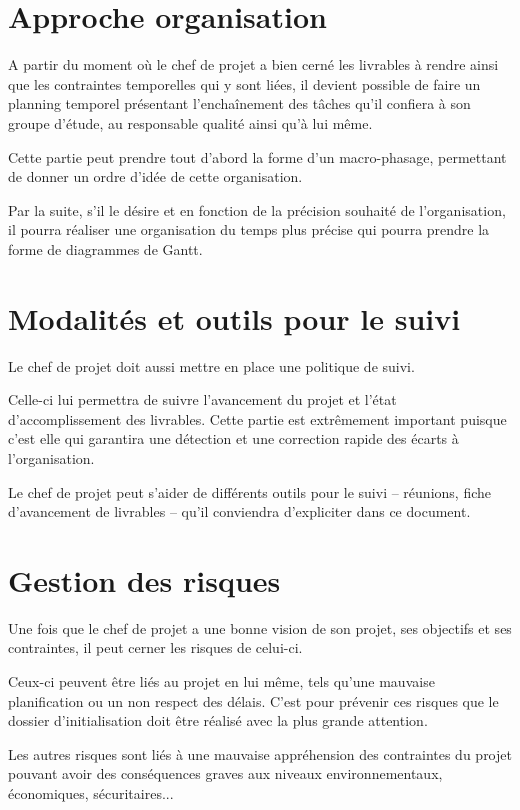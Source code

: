 \documentclass[a4paper, 11pt, draft]{article}
\begin{document}
\section{Approche organisation}

A partir du moment où le chef de projet a bien cerné les livrables à rendre ainsi que les contraintes temporelles qui y sont liées, il devient possible de faire un planning temporel présentant l'enchaînement des tâches qu'il confiera à son groupe d'étude, au responsable qualité ainsi qu'à lui même.

Cette partie peut prendre tout d'abord la forme d'un macro-phasage, permettant de donner un ordre d'idée de cette organisation.

Par la suite, s'il le désire et en fonction de la précision souhaité de l'organisation, il pourra réaliser une organisation du temps plus précise qui pourra prendre la forme de diagrammes de Gantt.

\section{Modalités et outils pour le suivi}

Le chef de projet doit aussi mettre en place une politique de suivi.

Celle-ci lui permettra de suivre l'avancement du projet et l'état d'accomplissement des livrables. Cette partie est extrêmement important puisque c'est elle qui garantira une détection et une correction rapide des écarts à l'organisation.

Le chef de projet peut s'aider de différents outils pour le suivi -- réunions, fiche d'avancement de livrables -- qu'il conviendra d'expliciter dans ce document.

\section{Gestion des risques}

Une fois que le chef de projet a une bonne vision de son projet, ses objectifs et ses contraintes, il peut cerner les risques de celui-ci.

Ceux-ci peuvent être liés au projet en lui même, tels qu'une mauvaise planification ou un non respect des délais. C'est pour prévenir ces risques que le dossier d'initialisation doit être réalisé avec la plus grande attention.

Les autres risques sont liés à une mauvaise appréhension des contraintes du projet pouvant avoir des conséquences graves aux niveaux environnementaux, économiques, sécuritaires...
\end{document}
